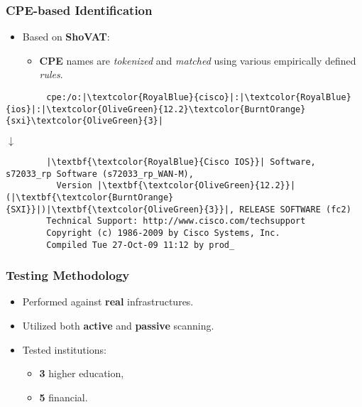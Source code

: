 \documentclass[aspectratio=169,xcolor={usenames,dvipsnames}]{beamer}
\begin{document}
\begin{frame}[fragile]
	\frametitle{CPE-based Identification}
	
	\begin{itemize}
		\item Based on \textbf{ShoVAT}:
		\begin{itemize}
			\item \textbf{CPE} names are \textit{tokenized} and \textit{matched} using various empirically defined \textit{rules}.
		\end{itemize}
	\end{itemize}
	
	\vspace{5pt}
	
	\begin{center}
	\begin{minipage}{.8\textwidth}
	\begin{verbatim}
		cpe:/o:|\textcolor{RoyalBlue}{cisco}|:|\textcolor{RoyalBlue}{ios}|:|\textcolor{OliveGreen}{12.2}\textcolor{BurntOrange}{sxi}\textcolor{OliveGreen}{3}|
	\end{verbatim}
	
	\vspace{-7pt}
	\begin{center}
		$\downarrow$
	\end{center}
	\vspace{-7pt}
	
	\begin{verbatim}
		|\textbf{\textcolor{RoyalBlue}{Cisco IOS}}| Software, s72033_rp Software (s72033_rp_WAN-M),
		  Version |\textbf{\textcolor{OliveGreen}{12.2}}|(|\textbf{\textcolor{BurntOrange}{SXI}}|)|\textbf{\textcolor{OliveGreen}{3}}|, RELEASE SOFTWARE (fc2)
		Technical Support: http://www.cisco.com/techsupport
		Copyright (c) 1986-2009 by Cisco Systems, Inc.
		Compiled Tue 27-Oct-09 11:12 by prod_ 
	\end{verbatim}
	\end{minipage}
	\end{center}
\end{frame}

\begin{frame}
	\frametitle{Testing Methodology}
	
	\begin{itemize}
		\item Performed against \textbf{real} infrastructures.
		\item Utilized both \textbf{active} and \textbf{passive} scanning.
		\item Tested institutions:
		\begin{itemize}
			\item \textbf{3} higher education,
			\item \textbf{5} financial.
		\end{itemize}
	\end{itemize}
\end{frame}
\end{document}
